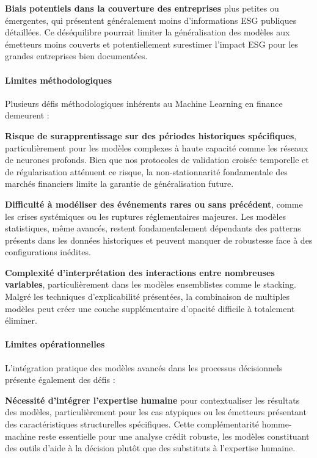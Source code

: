 \textbf{Biais potentiels dans la couverture des entreprises} plus petites ou émergentes, qui présentent généralement moins d'informations ESG publiques détaillées. Ce déséquilibre pourrait limiter la généralisation des modèles aux émetteurs moins couverts et potentiellement surestimer l'impact ESG pour les grandes entreprises bien documentées.

\paragraph{Limites méthodologiques}

Plusieurs défis méthodologiques inhérents au Machine Learning en finance demeurent :

\textbf{Risque de surapprentissage sur des périodes historiques spécifiques}, particulièrement pour les modèles complexes à haute capacité comme les réseaux de neurones profonds. Bien que nos protocoles de validation croisée temporelle et de régularisation atténuent ce risque, la non-stationnarité fondamentale des marchés financiers limite la garantie de généralisation future.

\textbf{Difficulté à modéliser des événements rares ou sans précédent}, comme les crises systémiques ou les ruptures réglementaires majeures. Les modèles statistiques, même avancés, restent fondamentalement dépendants des patterns présents dans les données historiques et peuvent manquer de robustesse face à des configurations inédites.

\textbf{Complexité d'interprétation des interactions entre nombreuses variables}, particulièrement dans les modèles ensemblistes comme le stacking. Malgré les techniques d'explicabilité présentées, la combinaison de multiples modèles peut créer une couche supplémentaire d'opacité difficile à totalement éliminer.

\paragraph{Limites opérationnelles}

L'intégration pratique des modèles avancés dans les processus décisionnels présente également des défis :

\textbf{Nécessité d'intégrer l'expertise humaine} pour contextualiser les résultats des modèles, particulièrement pour les cas atypiques ou les émetteurs présentant des caractéristiques structurelles spécifiques. Cette complémentarité homme-machine reste essentielle pour une analyse crédit robuste, les modèles constituant des outils d'aide à la décision plutôt que des substituts à l'expertise humaine.

